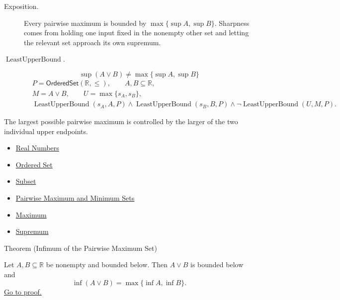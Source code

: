 \begin{remark*}
\begin{description}
\item[Exposition.]
Every pairwise maximum is bounded by $\max\{\sup A,\sup B\}$.  Sharpness comes
from holding one input fixed in the nonempty other set and letting the relevant
set approach its own supremum.


  \item[\(\operatorname{LeastUpperBound}.\)]
  \[
\sup(A\vee B)\neq\max\{\sup A,\sup B\}
\]
\[
\begin{aligned}
&P=\mathsf{OrderedSet}(\mathbb{R},\leq),\qquad A,B\subseteq\mathbb{R},\\
&M=A\vee B,\qquad U=\max\{s_A,s_B\},\\
&\operatorname{LeastUpperBound}(s_A,A,P)\land\operatorname{LeastUpperBound}(s_B,B,P)\land
\neg\operatorname{LeastUpperBound}(U,M,P).
\end{aligned}
\]
\end{description}
\end{remark*}

\begin{remark*}[Interpretation]
The largest possible pairwise maximum is controlled by the larger of the two
individual upper endpoints.
\end{remark*}

\begin{dependencies}
\begin{itemize}
  \item \hyperref[def:reals]{Real Numbers}
  \item \hyperref[def:ordered-set]{Ordered Set}
  \item \hyperref[def:subset]{Subset}
  \item \hyperref[def:pairwise-maximum-minimum-sets]{Pairwise Maximum and Minimum Sets}
  \item \hyperref[def:maximum]{Maximum}
  \item \hyperref[def:supremum]{Supremum}
\end{itemize}
\end{dependencies}

\begin{theorembox}{Theorem (Infimum of the Pairwise Maximum Set)}
\begin{theorem}
\label{thm:infimum-pairwise-maximum-set}
Let $A,B\subseteq\mathbb{R}$ be nonempty and bounded below. Then $A\vee B$
is bounded below and
\[
\inf(A\vee B)=\max\{\inf A,\inf B\}.
\]
\hyperref[prf:infimum-pairwise-maximum-set]{Go to proof.}
\end{theorem}
\end{theorembox}

